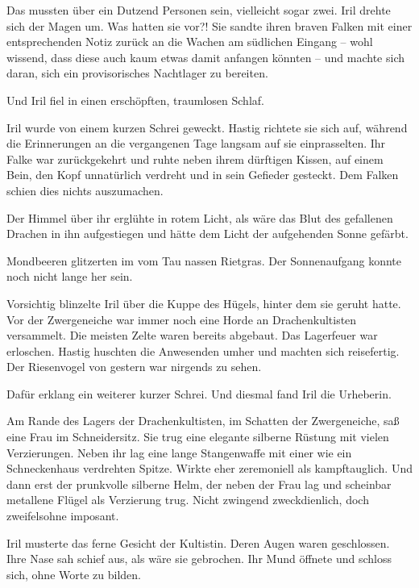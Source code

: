 Das mussten über ein Dutzend Personen sein, vielleicht sogar zwei. Iril drehte sich der Magen um. Was hatten sie vor?! Sie sandte ihren braven Falken mit einer entsprechenden Notiz zurück an die Wachen am südlichen Eingang – wohl wissend, dass diese auch kaum etwas damit anfangen könnten – und machte sich daran, sich ein provisorisches Nachtlager zu bereiten.

Und Iril fiel in einen erschöpften, traumlosen Schlaf.\bigskip







Iril wurde von einem kurzen Schrei geweckt. Hastig richtete sie sich auf, während die Erinnerungen an die vergangenen Tage langsam auf sie einprasselten. Ihr Falke war zurückgekehrt und ruhte neben ihrem dürftigen Kissen, auf einem Bein, den Kopf unnatürlich verdreht und in sein Gefieder gesteckt. Dem Falken schien dies nichts auszumachen.

Der Himmel über ihr erglühte in rotem Licht, als wäre das Blut des gefallenen Drachen in ihn aufgestiegen und hätte dem Licht der aufgehenden Sonne gefärbt.

Mondbeeren glitzerten im vom Tau nassen Rietgras. Der Sonnenaufgang konnte noch nicht lange her sein.

Vorsichtig blinzelte Iril über die Kuppe des Hügels, hinter dem sie geruht hatte. Vor der Zwergeneiche war immer noch eine Horde an Drachenkultisten versammelt. Die meisten Zelte waren bereits abgebaut. Das Lagerfeuer war erloschen. Hastig huschten die Anwesenden umher und machten sich reisefertig. Der Riesenvogel von gestern war nirgends zu sehen.

Dafür erklang ein weiterer kurzer Schrei. Und diesmal fand Iril die Urheberin.

Am Rande des Lagers der Drachenkultisten, im Schatten der Zwergeneiche, saß eine Frau im Schneidersitz. Sie trug eine elegante silberne Rüstung mit vielen Verzierungen. Neben ihr lag eine lange Stangenwaffe mit einer wie ein Schneckenhaus verdrehten Spitze. Wirkte eher zeremoniell als kampftauglich. Und dann erst der prunkvolle silberne Helm, der neben der Frau lag und scheinbar metallene Flügel als Verzierung trug. Nicht zwingend zweckdienlich, doch zweifelsohne imposant.

Iril musterte das ferne Gesicht der Kultistin. Deren Augen waren geschlossen. Ihre Nase sah schief aus, als wäre sie gebrochen. Ihr Mund öffnete und schloss sich, ohne Worte zu bilden.

